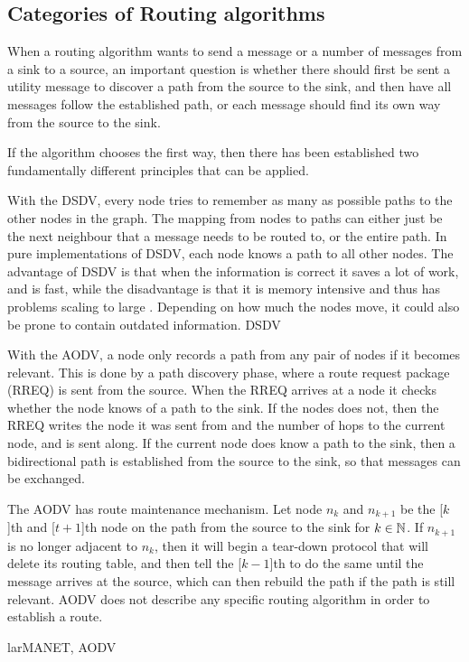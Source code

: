 \documentclass[letter, 12pt, english, draft]{article}
\begin{document}
\subsection{Categories of Routing algorithms}
When a routing algorithm wants to send a message or a number of messages from a sink to a source, an important question is whether there should first be sent a utility message to discover a path from the source to the sink, and then have all messages follow the established path, or each message should find its own way from the source to the sink.

If the algorithm chooses the first way, then there has been established two fundamentally different principles that can be applied.
\begin{description}
{With the DSDV, every node tries to remember as many as possible paths to the other nodes in the graph. The mapping from nodes to paths can either just be the next neighbour that a message needs to be routed to, or the entire path. In pure implementations of DSDV, each node knows a path to all other nodes. The advantage of DSDV is that when the information is correct it saves a lot of work, and is fast, while the disadvantage is that it is memory intensive and thus has problems scaling to large \manet. Depending on how much the nodes move, it could also be prone to contain outdated information.
}
{DSDV}

{With the AODV, a node only records a path from any pair of nodes if it becomes relevant. This is done by a path discovery phase, where a route request package (RREQ) is sent from the source. When the RREQ arrives at a node it checks whether the node knows of a path to the sink. If the nodes does not, then the RREQ writes the node it was sent from and the number of hops to the current node, and is sent along. If the current node does know a path to the sink, then a bidirectional path is established from the source to the sink, so that messages can be exchanged.

The AODV has route maintenance mechanism. Let node $n_k$ and $n_{k+1}$ be the [$k$]th and [$t+1$]th node on the path from the source to the sink for $k \in \mathbb{N}$. If $n_{k+1}$ is no longer adjacent to $n_{k}$, then it will begin a tear-down protocol that will delete its routing table, and then tell the [$k-1$]th to do the same until the message arrives at the source, which can then rebuild the path if the path is still relevant.
AODV does not describe any specific routing algorithm in order to establish a route.}
{larMANET, AODV}

\end{description}
\end{document}
